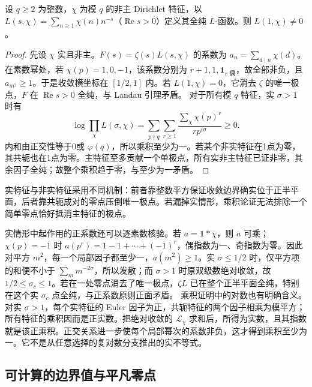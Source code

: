 \begin{theorem}\label{b3:thm:D-nonvanishing}
设 \(q\ge2\) 为整数，\(\chi\) 为模 \(q\) 的非主 Dirichlet 特征，以 \(L(s,\chi)=\sum_{n\ge1}\chi(n)n^{-s}\)（\(\operatorname{Re}s>0\)）定义其全纯 \(L\)-函数。则 \(L(1,\chi)\ne0\)。
\end{theorem}
\begin{proof}
先设 \(\chi\) 实且非主。\(F(s)=\zeta(s)L(s,\chi)\) 的系数为 \(a_n=\sum_{d\mid n}\chi(d)\)。在素数幂处，若 \(\chi(p)=1,0,-1\)，该系数分别为 \(r+1,1,\mathbf1_{r\text{ 偶}}\)，故全部非负，且 \(a_{m^2}\ge1\)。于是收敛横坐标在 \([1/2,1]\) 内。若 \(L(1,\chi)=0\)，它消去 \(\zeta\) 的唯一极点，\(F\) 在 \(\operatorname{Re}s>0\) 全纯，与 Landau 引理矛盾。
对于所有模 \(q\) 特征，实 \(\sigma>1\) 时有
\[
 \log\prod_\chi L(\sigma,\chi)
 =\sum_{p\nmid q}\sum_{r\ge1}\frac{\sum_\chi\chi(p)^r}{r p^{r\sigma}}\ge0.
\]
内和由正交性等于0或 \(\varphi(q)\)，所以乘积至少为一。若某个非实特征在1点为零，其共轭也在1点为零。主特征至多贡献一个单极点，所有实非主特征已证非零，其余因子全纯；故整个乘积趋于零，与至少为一矛盾。
\end{proof}
实特征与非实特征采用不同机制：前者靠整数平方保证收敛边界确实位于正半平面，后者靠共轭成对的零点压倒唯一极点。若漏掉实情形，乘积论证无法排除一个简单零点恰好抵消主特征的极点。

\ProseParagraphBreak
实情形中起作用的正系数还可以逐素数核验。若 \(a=\mathbf1*\chi\)，则 \(a\) 可乘；\(\chi(p)=-1\) 时 \(a(p^r)=1-1+\cdots+(-1)^r\)，偶指数为一、奇指数为零。因此对平方 \(m^2\)，每一个局部因子都至少一，\(a(m^2)\ge1\)。实 \(\sigma\le1/2\) 时，仅平方项的和便不小于 \(\sum_m m^{-2\sigma}\)，所以发散；而 \(\sigma>1\) 时原双级数绝对收敛，故 \(1/2\le\sigma_c\le1\)。若在一处零点消去了唯一极点，\(\zeta L\) 已在整个正半平面全纯，特别在这个实 \(\sigma_c\) 点全纯，与正系数原则正面矛盾。
\ProseParagraphBreak
乘积证明中的对数也有明确含义。对实 \(\sigma>1\)，每个实特征的 Euler 因子为正，共轭特征的两个因子相乘为模平方；所有特征的乘积因而是正实数。把绝对收敛的 \(\mathcal L_\chi\) 求和后，所得为实数，且其指数就是该正乘积。正交关系进一步使每个局部幂次的系数非负，这才得到乘积至少为一。它不是从任意选择的复对数分支推出的实不等式。

\subsection{可计算的边界值与平凡零点}
\label{b3:subsec:D0303}

